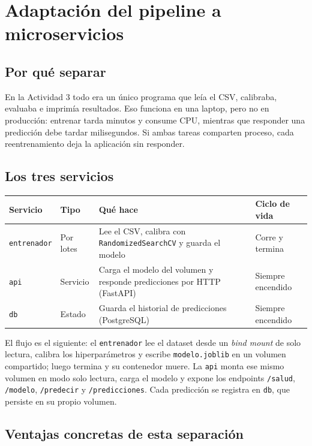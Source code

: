 \documentclass[12pt,a4paper]{article}
\begin{document}
\section{Adaptaci\'on del pipeline a microservicios}

\subsection{Por qu\'e separar}

En la Actividad 3 todo era un \'unico programa que le\'ia el CSV, calibraba, evaluaba e imprim\'ia
resultados. Eso funciona en una laptop, pero no en producci\'on: entrenar tarda minutos y consume
CPU, mientras que responder una predicci\'on debe tardar milisegundos. Si ambas tareas comparten
proceso, cada reentrenamiento deja la aplicaci\'on sin responder.

\subsection{Los tres servicios}

\begin{center}
\begin{tabular}{|l|l|p{5.2cm}|l|}
\hline
\textbf{Servicio} & \textbf{Tipo} & \textbf{Qu\'e hace} & \textbf{Ciclo de vida} \\
\hline
\texttt{entrenador} & Por lotes & Lee el CSV, calibra con
\texttt{RandomizedSearchCV} y guarda el modelo & Corre y termina \\
\hline
\texttt{api} & Servicio & Carga el modelo del volumen y responde
predicciones por HTTP (FastAPI) & Siempre encendido \\
\hline
\texttt{db} & Estado & Guarda el historial de predicciones
(PostgreSQL) & Siempre encendido \\
\hline
\end{tabular}
\end{center}

El flujo es el siguiente: el \texttt{entrenador} lee el dataset desde un \emph{bind mount} de solo
lectura, calibra los hiperpar\'ametros y escribe \texttt{modelo.joblib} en un volumen compartido;
luego termina y su contenedor muere. La \texttt{api} monta ese mismo volumen en modo solo lectura,
carga el modelo y expone los endpoints \texttt{/salud}, \texttt{/modelo}, \texttt{/predecir} y
\texttt{/predicciones}. Cada predicci\'on se registra en \texttt{db}, que persiste en su propio
volumen.

\subsection{Ventajas concretas de esta separaci\'on}
\end{document}

